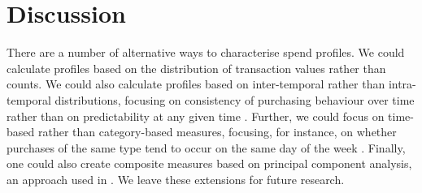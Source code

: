 
\section{Discussion}%
\label{sec:discussion}

There are a number of alternative ways to characterise spend profiles. We could
calculate profiles based on the distribution of transaction values rather than
counts. We could also calculate profiles based on inter-temporal rather than
intra-temporal distributions, focusing on consistency of purchasing behaviour
over time rather than on predictability at any given time
\citep{krumme2013predictability}. Further, we could focus on time-based rather
than category-based measures, focusing, for instance, on whether purchases of
the same type tend to occur on the same day of the week
\citep{guidotti2015behavioral}. Finally, one could also create composite
measures based on principal component analysis, an approach used in
\citet{eagle2010network}. We leave these extensions for future research.

